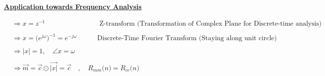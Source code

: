 \documentclass{article}
\begin{document}
\textbf{\underline{Application towards Frequency Analysis}}

\begin{align*}
    & \Rightarrow x = z^{-1} \quad \quad \quad \quad \quad \quad \quad \quad \text{Z-transform (Transformation of Complex Plane for Discrete-time analysis)} \\ \\
    & \Rightarrow x = \big(e^{j\omega}\big)^{-1} = e^{-j\omega} \quad \quad \quad \text{Discrete-Time Fourier Transform (Staying along unit circle)} \\ \\
    & \Rightarrow |x| = 1, \quad \angle{x} = \omega \\ \\
    & \Rightarrow \vec{m} = \vec{c} \odot \vec{|x|} = \vec{c} \quad , \quad R_{mm}\big(n\big) = R_{cc}\big(n\big) \\ \\
\end{align*}
\end{document}
